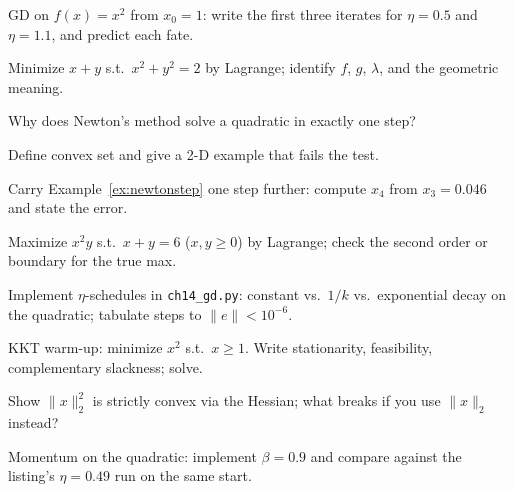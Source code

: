 \begin{exercise}[easy]
GD on $f(x)=x^2$ from $x_0=1$: write the first three iterates for
$\eta=0.5$ and $\eta=1.1$, and predict each fate.
\end{exercise}

\begin{exercise}[easy]
Minimize $x+y$ s.t.\ $x^2+y^2=2$ by Lagrange; identify $f$, $g$,
$\lambda$, and the geometric meaning.
\end{exercise}

\begin{exercise}[easy]
Why does Newton's method solve a quadratic in exactly one step?
\end{exercise}

\begin{exercise}[easy]
Define convex set and give a 2-D example that fails the test.
\end{exercise}

\begin{exercise}[easy]
Carry Example~\ref{ex:newtonstep} one step further: compute $x_4$ from
$x_3=0.046$ and state the error.
\end{exercise}

\begin{exercise}[medium]
Maximize $x^2y$ s.t.\ $x+y=6$ ($x,y\ge0$) by Lagrange; check the second
order or boundary for the true max.
\end{exercise}

\begin{exercise}[medium]
Implement $\eta$-schedules in \texttt{ch14\_gd.py}: constant vs.\
$1/k$ vs.\ exponential decay on the quadratic; tabulate steps to
$\|e\|<10^{-6}$.
\end{exercise}

\begin{exercise}[medium]
KKT warm-up: minimize $x^2$ s.t.\ $x\ge1$. Write stationarity, feasibility,
complementary slackness; solve.
\end{exercise}

\begin{exercise}[medium]
Show $\|x\|_2^2$ is strictly convex via the Hessian; what breaks if you
use $\|x\|_2$ instead?
\end{exercise}

\begin{exercise}[medium]
Momentum on the quadratic: implement $\beta=0.9$ and compare against the
listing's $\eta=0.49$ run on the same start.
\end{exercise}

